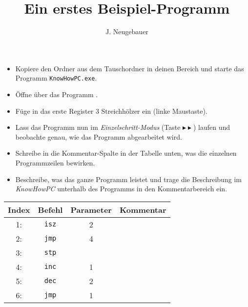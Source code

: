 \documentclass[10pt, a4paper]{scrartcl}
\author{J. Neugebauer}
\title{Ein erstes Beispiel-Programm}
\date{\Heute}
\begin{document}
\ReiheTitel

\begin{aufgabe}[symbol=\symLaptop]
	\begin{itemize}
		\item Kopiere den Ordner  aus dem Tauschordner in deinen Bereich und starte das Programm \texttt{KnowHowPC.exe}.
		\item Öffne über  das Programm .
		\item Füge in das erste Register 3 Streichhölzer ein (linke Maustaste).
		\item Lass das Programm nun im \emph{Einzelschritt-Modus} (Taste $\blacktriangleright\blacktriangleright$) laufen und beobachte genau, wie das Programm abgearbeitet wird.
	\end{itemize}
	
	\medskip
	\begin{itemize}
		\item Schreibe in die Kommentar-Spalte in der Tabelle unten, was die einzelnen Programmzeilen bewirken.
		\item Beschreibe, was das ganze Programm leistet und trage die Beschreibung im \emph{KnowHowPC} unterhalb des Programms in den Kommentarbereich ein.
	\end{itemize}
	
	\begin{center}
	\begin{tabularx}{.8\textwidth}{|c|c|c|X|}\hline
		\rowcolor{black!10}
		Index & Befehl & Parameter & Kommentar \\\hline
		1: & \texttt{isz} & 2 & \Zeilenabstand\\\hline
		2: & \texttt{jmp} & 4 & \Zeilenabstand\\\hline
		3: & \texttt{stp} &   & \Zeilenabstand\\\hline
		4: & \texttt{inc} & 1 & \Zeilenabstand\\\hline
		5: & \texttt{dec} & 2 & \Zeilenabstand\\\hline
		6: & \texttt{jmp} & 1 & \Zeilenabstand\\\hline
	\end{tabularx}
	\end{center}
\end{aufgabe}
\end{document}
